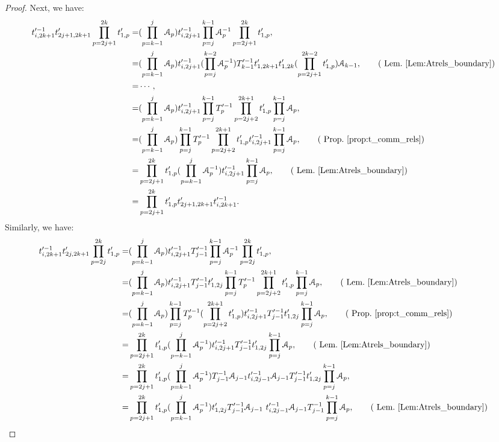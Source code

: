 \documentclass{amsart}
\begin{document}
\begin{proof}
Next, we have:
\begin{align*}
t'^{-1}_{i,2k+1}t'_{2j+1,2k+1}\prod^{2k}_{p=2j+1}t'_{1,p}=&(\prod^{j}_{p=k-1}\AA_p)t'^{-1}_{i,2j+1}\prod^{k-1}_{p=j}\AA^{-1}_p \prod^{2k}_{p=2j+1}t'_{1,p},\\
=&(\prod^{j}_{p=k-1}\AA_p)t'^{-1}_{i,2j+1}(\prod^{k-2}_{p=j}\AA^{-1}_p)T'^{-1}_{k-1}t'_{1,2k+1}t'_{1,2k}(\prod^{2k-2}_{p=2j+1}t'_{1,p})\AA_{k-1}, \qquad \text{( Lem.~\ref{Lem:Atrels_boundary})}\\
=&\cdots,\\
=&(\prod^{j}_{p=k-1}\AA_p)t'^{-1}_{i,2j+1}\prod^{k-1}_{p=j}T'^{-1}_p \prod^{2k+1}_{p=2j+2}t'_{1,p}\prod^{k-1}_{p=j}\AA_p, \\
=&(\prod^{j}_{p=k-1}\AA_p)\prod^{k-1}_{p=j}T'^{-1}_p \prod^{2k+1}_{p=2j+2}t'_{1,p}t'^{-1}_{i,2j+1}\prod^{k-1}_{p=j}\AA_p, \qquad \text{( Prop.~\ref{prop:t_comm_rels})}\\
=&\prod^{2k}_{p=2j+1}t'_{1,p}(\prod^{j}_{p=k-1}\AA^{-1}_p)t'^{-1}_{i,2j+1}\prod^{k-1}_{p=j}\AA_p,\qquad \text{( Lem.~\ref{Lem:Atrels_boundary})}\\
=&\prod^{2k}_{p=2j+1}t'_{1,p}t'_{2j+1,2k+1}t'^{-1}_{i,2k+1}.
\end{align*}
Similarly, we have:
\begin{align*}
t'^{-1}_{i,2k+1}t'_{2j,2k+1}\prod^{2k}_{p=2j}t'_{1,p}=&(\prod^{j}_{p=k-1}\AA_p)t'^{-1}_{i,2j+1}T'^{-1}_{j-1}\prod^{k-1}_{p=j}\AA^{-1}_p \prod^{2k}_{p=2j}t'_{1,p},\\
=&(\prod^{j}_{p=k-1}\AA_p)t'^{-1}_{i,2j+1}T'^{-1}_{j-1}t'_{1,2j}\prod^{k-1}_{p=j}T'^{-1}_p \prod^{2k+1}_{p=2j+2}t'_{1,p}\prod^{k-1}_{p=j}\AA_p, \qquad \text{( Lem.~\ref{Lem:Atrels_boundary})}\\
=&(\prod^{j}_{p=k-1}\AA_p)\prod^{k-1}_{p=j}T'^{-1}_p (\prod^{2k+1}_{p=2j+2}t'_{1,p})t'^{-1}_{i,2j+1}T'^{-1}_{j-1}t'_{1,2j}\prod^{k-1}_{p=j}\AA_p, \qquad \text{( Prop.~\ref{prop:t_comm_rels})} \\
=&\prod^{2k}_{p=2j+1}t'_{1,p}(\prod^{j}_{p=k-1}\AA^{-1}_p)t'^{-1}_{i,2j+1}T'^{-1}_{j-1}t'_{1,2j}\prod^{k-1}_{p=j}\AA_p, \qquad \text{( Lem.~\ref{Lem:Atrels_boundary})}\\
=&\prod^{2k}_{p=2j+1}t'_{1,p}(\prod^{j}_{p=k-1}\AA^{-1}_p)T^{-1}_{j-1}\AA_{j-1}t'^{-1}_{i,2j-1}\AA_{j-1}T'^{-1}_{j-1}t'_{1,2j}\prod^{k-1}_{p=j}\AA_p,\\
=&\prod^{2k}_{p=2j+1}t'_{1,p}(\prod^{j}_{p=k-1}\AA^{-1}_p)t'_{1,2j}T'^{-1}_{j-1}\AA_{j-1}\ t'^{-1}_{i,2j-1}\AA_{j-1}T^{-1}_{j-1}\prod^{k-1}_{p=j}\AA_p, \qquad \text{( Lem.~\ref{Lem:Atrels_boundary})}\\

\end{align*}
\end{proof}
\end{document}
